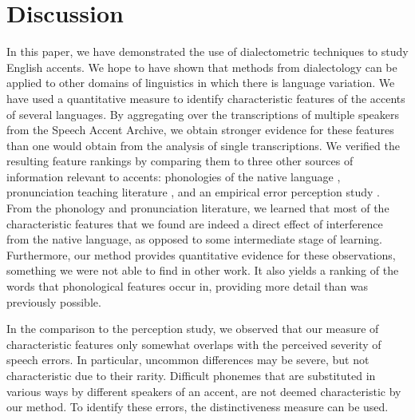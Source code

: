 \documentclass[output=paper]{LSP/langsci}
\begin{document}

\section{Discussion}
In this paper, we have demonstrated the use of dialectometric techniques to study English accents. We hope to have shown that methods from dialectology can be applied to other domains of linguistics in which there is language variation. We have used a quantitative measure to identify characteristic features of the accents of several languages. By aggregating over the transcriptions of multiple speakers from the Speech Accent Archive, we obtain stronger evidence for these features than one would obtain from the analysis of single transcriptions. We verified the resulting feature rankings by comparing them to three other sources of information relevant to accents: phonologies of the native language \citep{walker_french_2001}, pronunciation teaching literature \citep{nadasdy_background_2006}, and an empirical error perception study \citep{van_den_doel_evaluation_2006}. From the phonology and pronunciation literature, we learned that most of the characteristic features that we found are indeed a direct effect of interference from the native language, as opposed to some intermediate stage of learning. Furthermore, our method provides quantitative evidence for these observations, something we were not able to find in other work. It also yields a ranking of the words that phonological features occur in, providing more detail than was previously possible.

In the comparison to the perception study, we observed that our measure of characteristic features only somewhat overlaps with the perceived severity of speech errors. In particular, uncommon differences may be severe, but not characteristic due to their rarity. Difficult phonemes that are substituted in various ways by different speakers of an accent, are not deemed characteristic by our method. To identify these errors, the distinctiveness measure can be used.
\end{document}
